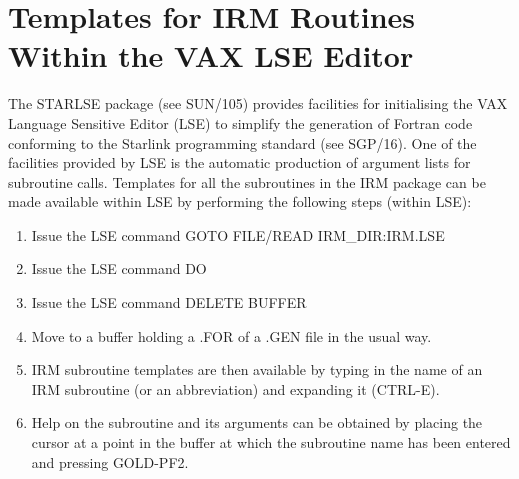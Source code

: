\section {Templates for IRM Routines Within the VAX LSE Editor}
The STARLSE package (see SUN/105) provides facilities for initialising the VAX
Language Sensitive Editor (LSE) to simplify the generation of Fortran
code conforming to the Starlink programming standard (see SGP/16). One of the
facilities provided by LSE is the automatic production of argument lists for
subroutine calls. Templates for all the subroutines in the IRM package can be 
made available within LSE by performing the following steps (within LSE):
\begin{enumerate}
\item Issue the LSE command GOTO FILE/READ IRM\_DIR:IRM.LSE
\item Issue the LSE command DO
\item Issue the LSE command DELETE BUFFER
\item Move to a buffer holding a .FOR of a .GEN file in the usual way.
\item IRM subroutine templates are then available by typing in the name of an 
IRM subroutine (or an abbreviation) and expanding it (CTRL-E).
\item Help on the subroutine and its arguments can be obtained by placing the
cursor at a point in the buffer at which the subroutine name has been entered 
and pressing GOLD-PF2.
\end{enumerate}

